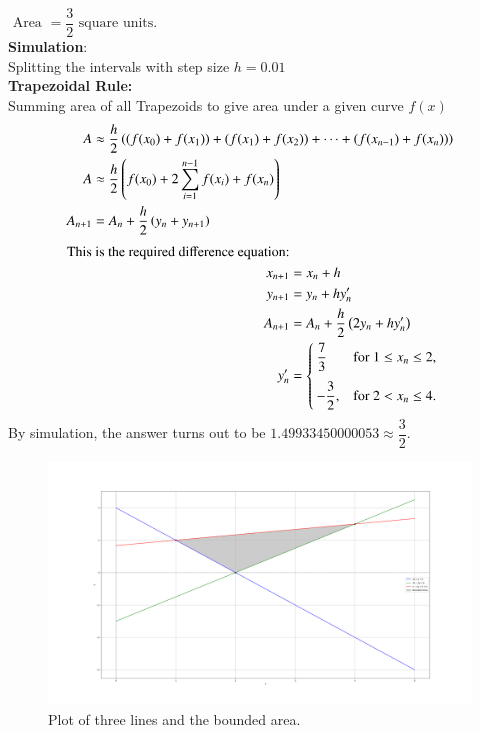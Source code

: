 \documentclass[journal]{IEEEtran}
\numberwithin{equation}{enumi}
\numberwithin{figure}{enumi}
\begin{document}
$\text{ Area }= \dfrac{3}{2} \text{ square units.}$\\
\textbf{Simulation}:
\\
Splitting the intervals  with step size $h = 0.01$
\\
\textbf{Trapezoidal Rule:}\\
Summing area of  all Trapezoids to give area under a given curve $f(x)$\\
\begin{align}
	A &\approx \frac{h}{2} \left((f(x_{0}) + f(x_{1})) + (f(x_{1}) + f(x_{2})) + \dots + (f(x_{n-1}) + f(x_{n}))\right) \\
	A &\approx \frac{h}{2} \left(f(x_{0}) + 2 \sum_{i=1}^{n-1} f(x_{i}) + f(x_{n}) \right)\\
    A_{n+1} &= A_{n} + \frac{h}{2} \left(y_{n} + y_{n+1}\right)
    \end{align}
    \begin{align}
    \text{This is the required difference equation:}\\
x_{n+1} &=x_{n}+h\\
y_{n+1} &=y_{n}+hy'_{n}\\
A_{n+1} &= A_{n} + \frac{h}{2} \left(2y_{n} +  h y^{\prime}_{n}\right)\\
y'_{n}&=\begin{cases} 
     \dfrac{7}{3}
 & \text{for } 1 \leq x_{n} \leq 2, \\[10pt]
 -\dfrac{3}{2} , & \text{for } 2 < x_{n} \leq 4.
\end{cases}
\end{align}
By simulation, the answer turns out to be $1.49933450000053  \approx \dfrac{3}{2}.$

\begin{figure}[h!]
    \centering
    \includegraphics[width=\columnwidth]{Figs/Figure_1.png}
    \caption{Plot of three lines and the bounded area.}
\end{figure}
\end{document}
